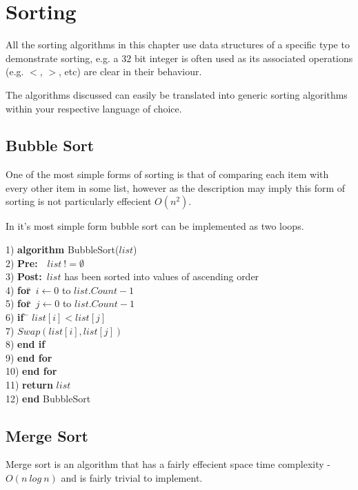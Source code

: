\chapter{Sorting}
All the sorting algorithms in this chapter use data structures of a specific type to demonstrate sorting, e.g. a $32$ bit integer is often used as its associated operations (e.g. $<$, $>$, etc) are clear in their behaviour.

The algorithms discussed can easily be translated into generic sorting algorithms within your respective language of choice.

\section{Bubble Sort}
One of the most simple forms of sorting is that of comparing each item with every other item in some list, however as the description may imply this form of sorting is not particularly effecient $O(n^{2})$.

In it's most simple form bubble sort can be implemented as two loops.

\begin{tabbing}
1)  \textbf{alg}\= \textbf{orithm} BubbleSort($list$) \\
2)  \> \textbf{Pre:}~~$list~!= \emptyset$ \\
3)  \> \textbf{Post:}~$list$ has been sorted into values of ascending order \\
4)  \> \textbf{for}\=~$i \leftarrow 0$ to $list.Count - 1$ \\
5)  \> \> \textbf{for}\=~$j \leftarrow 0$ to $list.Count - 1$ \\
6)  \> \> \> \textbf{if}~\= $list[i] < list[j]$ \\
7)  \> \> \> \> $Swap(list[i], list[j])$ \\
8)  \> \> \> \textbf{end if} \\
9)  \> \> \textbf{end for} \\
10) \> \textbf{end for} \\
11) \> \textbf{return} $list$ \\
12) \textbf{end} BubbleSort
\end{tabbing}

\section{Merge Sort}
Merge sort is an algorithm that has a fairly effecient space time complexity - $O(n~log~n)$ and is fairly trivial to implement.

